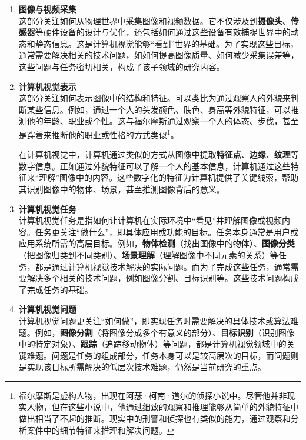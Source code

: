 \begin{enumerate}
   \item \textbf{图像与视频采集}  \\
    这部分关注如何从物理世界中采集图像和视频数据。它不仅涉及到\textbf{摄像头}、\textbf{传感器}等硬件设备的设计与优化，还包括如何通过这些设备有效捕捉世界中的动态和静态信息。这是计算机视觉能够“看到”世界的基础。为了实现这些目标，通常需要解决相关的技术问题，如如何提高图像质量、如何减少采集误差等，这些问题与任务密切相关，构成了该子领域的研究内容。

     \item \textbf{计算机视觉表示}  \\
    这部分关注如何表示图像中的结构和特征。可以类比为通过观察人的外貌来判断某些信息。例如，通过一个人的头发颜色、肤色、身高等外貌特征，可以推测他的年龄、职业或个性。这与福尔摩斯通过观察一个人的体态、步伐，甚至是穿着来推断他的职业或性格的方式类似\footnote{福尔摩斯是虚构人物，出现在阿瑟·柯南·道尔的侦探小说中。尽管他并非现实人物，但在这些小说中，他通过细致的观察和推理能够从简单的外貌特征中做出相当了不起的推断。现实中的刑警和侦探也有类似的能力，通过观察和分析案件中的细节特征来推理和解决问题。}。

    在计算机视觉中，计算机通过类似的方式从图像中提取\textbf{特征点}、\textbf{边缘}、\textbf{纹理}等数字信息。正如通过外貌特征可以了解一个人的基本信息，计算机通过这些特征来“理解”图像中的内容。这些数字化的特征为计算机提供了关键线索，帮助其识别图像中的物体、场景，甚至推测图像背后的意义。

 
    \item \textbf{计算机视觉任务}  \\
    计算机视觉任务是指如何让计算机在实际环境中“看见”并理解图像或视频内容。任务更关注“做什么”，即具体应用或功能的目标。任务本身通常是用户或应用系统所需的高层目标。例如，\textbf{物体检测}（找出图像中的物体）、\textbf{图像分类}（把图像归类到不同类别）、\textbf{场景理解}（理解图像中不同元素的关系）等任务，都是通过计算机视觉技术解决的实际问题。而为了完成这些任务，通常需要解决多个相关的技术问题，例如图像分割、目标识别等。这些技术问题构成了完成任务的基础。

    \item \textbf{计算机视觉问题}  \\
    计算机视觉问题更关注“如何做”，即实现任务时需要解决的具体技术或算法难题。例如，\textbf{图像分割}（将图像分成多个有意义的部分）、\textbf{目标识别}（识别图像中的特定对象）、\textbf{跟踪}（追踪移动物体）等问题，都是计算机视觉领域中的关键难题。问题是任务的组成部分，任务本身可以是较高层次的目标，而问题则是实现该目标所需解决的低层次技术难题，仍然是当前研究的重点。
    

\end{enumerate}

